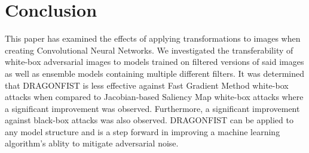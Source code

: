 \section{Conclusion} \label{s:conclusion}
	This paper has examined the effects of applying transformations to images when creating Convolutional Neural Networks. We investigated the transferability of white-box adversarial images to models trained on filtered versions of said images as well as ensemble models containing multiple different filters. It was determined that DRAGONFIST is less effective against Fast Gradient Method white-box attacks when compared to Jacobian-based Saliency Map white-box attacks where a significant improvement was observed. Furthermore, a significant improvement against black-box attacks was also observed. DRAGONFIST can be applied to any model structure and is a step forward in improving a machine learning algorithm's ablity to mitigate adversarial noise.
